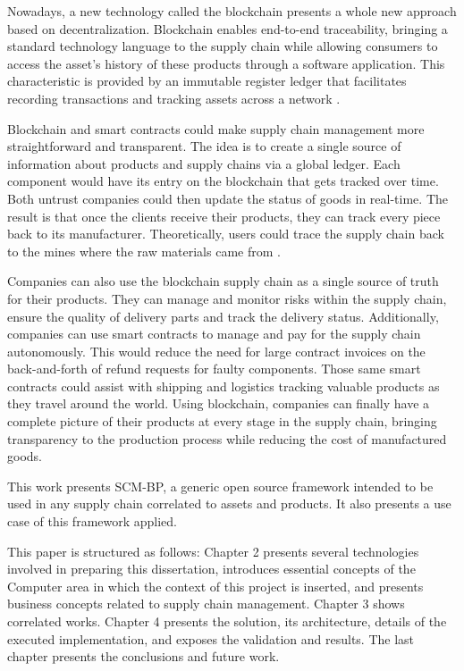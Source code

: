 Nowadays, a new technology called the blockchain presents a whole new approach based on decentralization. Blockchain enables end-to-end traceability, bringing a standard technology language to the supply chain while allowing consumers to access the asset's history of these products through a software application. This characteristic is provided by an immutable register ledger that facilitates recording transactions and tracking assets across a network \cite{galvez2018future}.



Blockchain and smart contracts could make supply chain management more straightforward and transparent. The idea is to create a single source of information about products and supply chains via a global ledger. Each component would have its entry on the blockchain that gets tracked over time. Both untrust companies could then update the status of goods in real-time. The result is that once the clients receive their products, they can track every piece back to its manufacturer. Theoretically, users could trace the supply chain back to the mines where the raw materials came from \cite{greve2018blockchain}.

Companies can also use the blockchain supply chain as a single source of truth for their products. They can manage and monitor risks within the supply chain, ensure the quality of delivery parts and track the delivery status. Additionally, companies can use smart contracts to manage and pay for the supply chain autonomously. This would reduce the need for large contract invoices on the back-and-forth of refund requests for faulty components. Those same smart contracts could assist with shipping and logistics tracking valuable products as they travel around the world. Using blockchain, companies can finally have a complete picture of their products at every stage in the supply chain, bringing transparency to the production process while reducing the cost of manufactured goods.

This work presents \acf{SCM-BP}, a generic open source framework intended to be used in any supply chain correlated to assets and products. It also presents a use case of this framework applied.

This paper is structured as follows: Chapter 2 presents several technologies involved in preparing this dissertation, introduces essential concepts of the Computer area in which the context of this project is inserted, and presents business concepts related to supply chain management. Chapter 3 shows correlated works. Chapter 4 presents the solution, its architecture, details of the executed implementation, and exposes the validation and results. The last chapter presents the conclusions and future work.